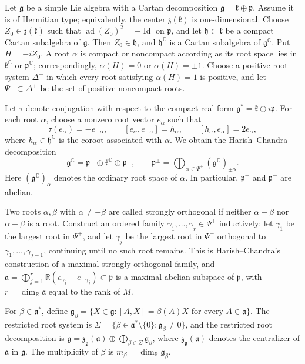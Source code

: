 \documentclass[11pt,reqno]{amsart}
\theoremstyle{corollary}
\theoremstyle{conjecture}
\theoremstyle{assumption}
\theoremstyle{proposition}
\theoremstyle{remark}
\numberwithin{equation}{section}
\begin{document}
Let $\mathfrak g$ be a simple Lie algebra with a Cartan decomposition $\mathfrak g=\mathfrak k\oplus\mathfrak p$. Assume it is of Hermitian type; equivalently, the center $\mathfrak z(\mathfrak k)$ is one-dimensional. Choose $Z_0\in\mathfrak z(\mathfrak k)$ such that $\operatorname{ad}(Z_0)^2=-\operatorname{Id}$ on $\mathfrak p$, and let $\mathfrak h\subset\mathfrak k$ be a compact Cartan subalgebra of $\mathfrak g$. Then $Z_0\in\mathfrak h$, and $\mathfrak h^{\mathbb C}$ is a Cartan subalgebra of $\mathfrak g^{\mathbb C}$. Put $H=-iZ_0$. A root $\alpha$ is compact or noncompact according as its root space lies in $\mathfrak k^{\mathbb C}$ or $\mathfrak p^{\mathbb C}$; correspondingly, $\alpha(H)=0$ or $\alpha(H)=\pm1$. Choose a positive root system $\Delta^+$ in which every root satisfying $\alpha(H)=1$ is positive, and let $\Psi^+\subset\Delta^+$ be the set of positive noncompact roots.

Let $\tau$ denote conjugation with respect to the compact real form $\mathfrak g^*=\mathfrak k\oplus i\mathfrak p$. For each root $\alpha$, choose a nonzero root vector $e_\alpha$ such that
\[
\tau(e_\alpha)=-e_{-\alpha},
\qquad
[e_\alpha,e_{-\alpha}]=h_\alpha,
\qquad
[h_\alpha,e_\alpha]=2e_\alpha,
\]
where $h_\alpha\in\mathfrak h^{\mathbb C}$ is the coroot
associated with $\alpha$.
We obtain the Harish--Chandra decomposition
\[
\mathfrak g^{\mathbb C}=\mathfrak p^-\oplus\mathfrak k^{\mathbb C}\oplus\mathfrak p^+,\qquad\mathfrak p^\pm=\bigoplus_{\alpha\in\Psi^+}(\mathfrak g^{\mathbb C})_{\pm\alpha}.
\]
Here $(\mathfrak g^{\mathbb C})_\alpha$ denotes the ordinary root space of $\alpha$. In particular, $\mathfrak p^+$ and $\mathfrak p^-$ are abelian.

Two roots $\alpha,\beta$ with $\alpha\ne\pm\beta$ are called strongly orthogonal if neither $\alpha+\beta$ nor $\alpha-\beta$ is a root. Construct an ordered family $\gamma_1,\ldots,\gamma_r\in\Psi^+$ inductively: let $\gamma_1$ be the largest root in $\Psi^+$, and let $\gamma_j$ be the largest root in $\Psi^+$ orthogonal to $\gamma_1,\ldots,\gamma_{j-1}$, continuing until no such root remains. This is Harish--Chandra's construction of a maximal strongly orthogonal family, and $\mathfrak a=\bigoplus_{j=1}^r\mathbb R(e_{\gamma_j}+e_{-\gamma_j})\subset\mathfrak p$ is a maximal abelian subspace of $\mathfrak p$, with $r=\dim_{\mathbb R}\mathfrak a$ equal to the rank of $M$.

For $\beta\in\mathfrak a^*$, define $\mathfrak g_\beta=\{X\in\mathfrak g\colon [A,X]=\beta(A)X\text{ for every }A\in\mathfrak a\}$. The restricted root system is $\Sigma=\{\beta\in\mathfrak a^*\setminus\{0\}\colon\mathfrak g_\beta\neq 0\}$, and the restricted root decomposition is $\mathfrak g=\mathfrak z_{\mathfrak g}(\mathfrak a)\oplus\bigoplus_{\beta\in\Sigma}\mathfrak g_\beta$, where $\mathfrak z_{\mathfrak g}(\mathfrak a)$ denotes the centralizer of $\mathfrak a$ in $\mathfrak g$. The multiplicity of $\beta$ is
$m_\beta=\dim_{\mathbb R}\mathfrak g_\beta$.
\end{document}
